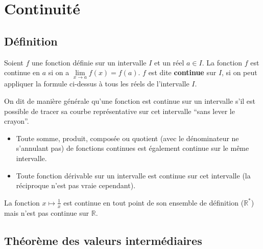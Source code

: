


	
	\section{Continuité}
	
	\subsection{Définition}
	
	\begin{formula}[Définition]
		Soient $f$ une fonction définie sur un intervalle $I$ et un réel $a \in I$. La fonction $f$ est continue en $a$ si on a $\lim\limits_{x \rightarrow a} f(x) = f(a)$.
		\newpar
		$f$ est dite \textbf{continue} sur $I$, si on peut appliquer la formule ci-dessus à tous les réels de l'intervalle $I$.
	\end{formula}
	
	On dit de manière générale qu'une fonction est continue sur un intervalle s'il est possible de tracer sa courbe représentative sur cet intervalle ``sans lever le crayon''.
	
	\begin{formula}
		\entretitreetliste
		\begin{itemize}
			\item Toute somme, produit, composée ou quotient (avec le dénominateur ne s'annulant pas) de fonctions continues est également continue sur le même intervalle.
			\item Toute fonction dérivable sur un intervalle est continue sur cet intervalle (la réciproque n'est pas vraie cependant).
		\end{itemize}
	\end{formula}
	
	\begin{tip}[Exemple]
		La fonction $x \mapsto \frac{1}{x}$ est continue en tout point de son ensemble de définition ($\mathbb{R}^{*}$) mais n'est pas continue sur $\mathbb{R}$.
	\end{tip}
	
	\subsection{Théorème des valeurs intermédiaires}
	
